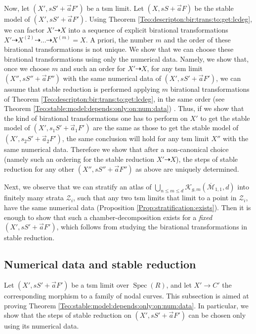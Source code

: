 \documentclass[11pt]{amsart}
\newcommand{\spec}{\operatorname{Spec}}
\theoremstyle{definition}
\begin{document}
Now, let $(X',sS'+\vec{a}F')$ be a tsm limit. Let $(X,sS+\vec{a}F)$ be the
stable model of $(X',sS'+\vec{a}F')$. Using Theorem \ref{Teo:descripton:bir:trans:to:get:lcdeg}, we can
factor $X' \dashrightarrow X$ into a sequence of explicit birational transformations
$X' \dashrightarrow X^{(2)} \dashrightarrow ... \dashrightarrow X^{(m)}=X$.
A priori, the number $m$ and the order of these birational transformations is not unique. We show that we can choose these birational transformations
using only the numerical data. Namely,
we show that, once
we choose $m$ and such an order for $X' \dashrightarrow X$, for any tsm limit $(X'',sS''+\vec{a}F'')$ with the same numerical data of
$(X',sS'+\vec{a}F')$, we can assume that stable reduction is performed
applying $m$ birational transformations of Theorem \ref{Teo:descripton:bir:trans:to:get:lcdeg}, in the same order (see Theorem \ref{Teo:stable:model:depends:only:on:num:data}) .
Thus, if we show that the kind of birational transformations one has to perform on $X'$ to get the stable model of
$(X',s_1S'+\vec{a}_1F')$ are the same as those to get the stable model of $(X',s_2S'+\vec{a}_2F')$, the same conclusion will hold for any tsm limit $X''$
with the same numerical data.
Therefore we show that after a non-canonical choice (namely such an ordering for the stable reduction
$X' \dashrightarrow X$), the steps of stable reduction for any other
$(X'',sS''+\vec{a}F'')$ as above are uniquely determined.

Next, we observe that we can stratify an atlas of $\bigcup _{n \le m \le d}\mathcal{K}_{g,m}(\overline{\mathcal{M}}_{1,1},d)$ into finitely many strata $\mathcal{Z}_i$,
such that any two tsm limits that limit to a point in $\mathcal{Z}_i$, have the same numerical data (Proposition \ref{Prop:stratification:exists}).
Then it is enough to show that such a chamber-decomposition exists for a \emph{fixed} $(X',sS'+\vec{a}F')$, which
follows from studying the birational transformations in stable reduction.
\subsection{Numerical data and stable reduction}\label{Subsection:alg:nature:stable:reduction}
Let $(X',sS'+\vec{a}F')$ be a tsm limit over $\spec(R)$, and let $X' \to C'$
the corresponding morphism to a family of nodal curves. This subsection is aimed at proving Theorem \ref{Teo:stable:model:depends:only:on:num:data}. In particular, we show that the steps of stable reduction on $(X',sS'+\vec{a}F')$
can be chosen only using its numerical data.
\end{document}
